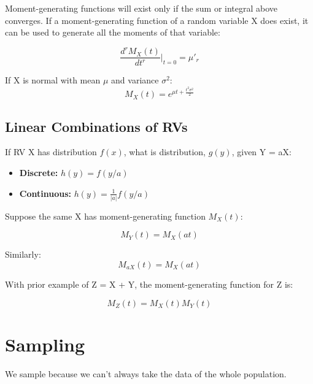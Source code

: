 \documentclass[10pt, letterpaper, twoside]{article}
\begin{document}
\begin{multicols}{2}
Moment-generating functions will exist only if the sum or integral above converges. If a moment-generating function of a random variable X does exist,
it can be used to generate all the moments of that variable:

\begin{equation*}
    \frac{d^rM_X(t)}{dt^r}\Big|_{t=0} = \mu'_r
\end{equation*}

If X is normal with mean $\mu$ and variance $\sigma^2$:
\begin{equation*}
    M_X(t) = e^{\mu t+\frac{t^2\sigma^2}{2}}
\end{equation*}

\subsection*{Linear Combinations of RVs}

If RV X has distribution $f(x)$, what is distribution, $g(y)$, given Y = aX:
\begin{itemize}
    \item \textbf{Discrete:} $h(y) = f(y/a)$
    \item \textbf{Continuous:} $h(y) = \frac{1}{|a|}f(y/a)$
\end{itemize}

Suppose the same X has moment-generating function $M_X(t)$:

\begin{equation*}
    M_Y(t) = M_X(at)
\end{equation*}

Similarly:
\begin{equation*}
    M_{aX}(t) = M_X(at)
\end{equation*}

With prior example of Z = X + Y, the moment-generating function for Z is:

\begin{equation*}
    M_Z(t) = M_X(t)M_Y(t)
\end{equation*}

\vfill\pagebreak

\section{Sampling}

We sample because we can't always take the data of the whole population.


\end{multicols}
\end{document}
